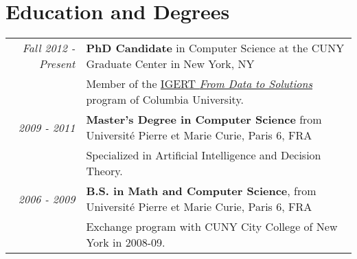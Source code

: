 \documentclass[a4paper,10pt]{article}
\begin{document}
\section{Education and Degrees}
    \vspace{0.2cm}
    \begin{tabular}{rp{14cm}} 
        \hspace{0.35cm} \emph{Fall 2012 - Present} & \textbf{PhD Candidate} in Computer Science at the CUNY Graduate Center in New York, NY\\
        & Member of the \href{http://www.cs.columbia.edu/igert/people_students.shtml}{IGERT {\em From Data to Solutions}} program of Columbia University.
        \vspace{0.15cm} \\

        \emph{2009 - 2011} & {\bfseries Master's Degree in Computer Science} from Université Pierre et Marie Curie, Paris 6, FRA \\
        & Specialized in Artificial Intelligence and Decision Theory.
        \vspace{0.15cm} \\

         
        \emph{2006 - 2009} & {\bfseries B.S. in Math and Computer Science}, from Université Pierre et Marie Curie, Paris 6, FRA \\ 
        & Exchange program with CUNY City College of New York in 2008-09.
        \vspace{0.15cm} \\
         
         

    \end{tabular}
\end{document}
